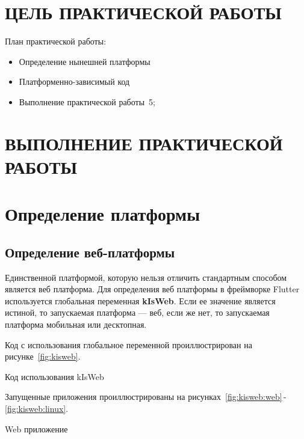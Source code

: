 \section*{ЦЕЛЬ ПРАКТИЧЕСКОЙ РАБОТЫ}

План практической работы:

\begin{itemize}
	\item Определение нынешней платформы
	\item Платформенно-зависимый код
	\item Выполнение практической работы \No\,5;
\end{itemize}

\clearpage

\section*{ВЫПОЛНЕНИЕ ПРАКТИЧЕСКОЙ РАБОТЫ}

\section{Определение платформы}

\subsection{Определение веб-платформы}

Единственной платформой,
которую нельзя отличить стандартным способом является веб платформа.
Для определения веб платформы в фреймворке Flutter используется
глобальная переменная \textbf{kIsWeb}.
Если ее значение является истиной,
то запускаемая платформа --- веб, если же нет,
то запускаемая платформа мобильная или десктопная.

Код с использования глобальное переменной проиллюстрирован
на рисунке~\ref{fig:kisweb}.

\begin{image}
	\caption{Код использования kIsWeb}
	\label{fig:kisweb}
\end{image}

Запущенные приложения проиллюстрированы
на рисунках~\ref{fig:kisweb:web}\,-\,\ref{fig:kisweb:linux}.

\begin{image}
	\caption{Web приложение}
	\label{fig:kisweb:web}
\end{image}

